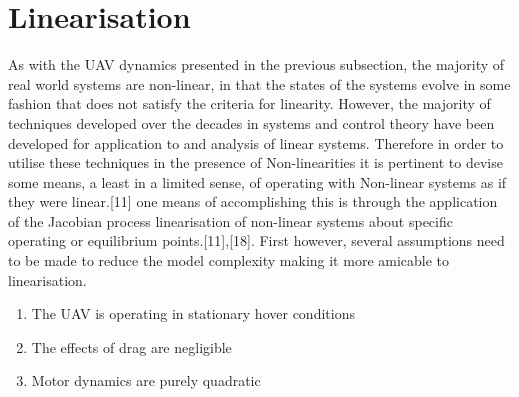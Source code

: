 \documentclass[12pt,a4paper,twoside]{report}
\begin{document}
		\newpage
		
		\section{Linearisation}
				
			As with the UAV dynamics presented in the previous subsection, the majority of real world systems are non-linear, in that the states of the systems evolve in some fashion that does not satisfy the criteria for linearity. However, the majority of techniques developed over the decades in systems and control theory have been developed for application to and analysis of linear systems. Therefore in order to utilise these techniques in the presence of Non-linearities it is pertinent to devise some means, a least in a limited sense, of operating with Non-linear systems as if they were linear.[11] one means of accomplishing this is through the application of the  Jacobian process linearisation of non-linear systems about specific operating or equilibrium points.[11],[18]. First however, several assumptions need to be made to reduce the model complexity making it more amicable to linearisation. 
				
			\begin{enumerate}
				\item 
					The UAV is operating in stationary hover conditions
				\item 
					The effects of drag are negligible
				\item 
					Motor dynamics are purely quadratic
			\end{enumerate}
\end{document}
